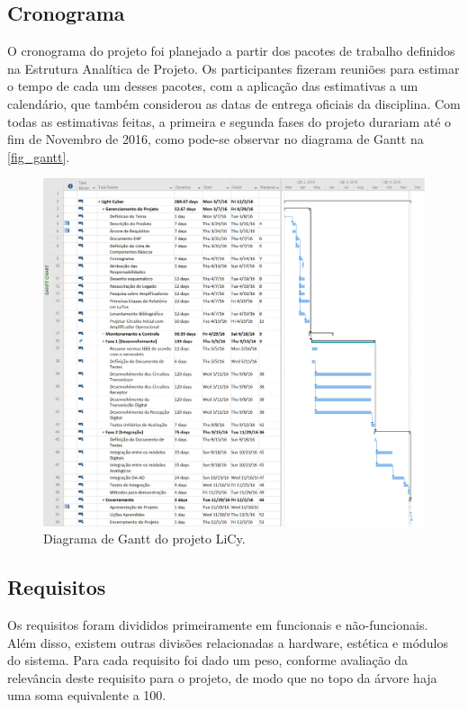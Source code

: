 	\subsection{Cronograma}\label{subsec-cronograma}

	O cronograma do projeto foi planejado a partir dos pacotes de trabalho definidos na Estrutura Analítica de Projeto. Os participantes fizeram reuniões para estimar o tempo de cada um desses pacotes, com a aplicação das estimativas a um calendário, que também considerou as datas de entrega oficiais da disciplina. Com todas as estimativas feitas, a primeira e segunda fases do projeto durariam até o fim de Novembro de 2016, como pode-se observar no diagrama de Gantt na \autoref{fig_gantt}.

	\begin{figure}[h!]
		\caption{\label{fig_gantt}Diagrama de Gantt do projeto LiCy.}
		\centering
		\includegraphics[width=1.0\textwidth]{gantt.png}
	\end{figure}

	\subsection{Requisitos}\label{subsec-requisitos}

	Os requisitos foram divididos primeiramente em funcionais e não-funcionais. Além disso, existem outras divisões relacionadas a hardware, estética e módulos do sistema. Para cada requisito foi dado um peso, conforme avaliação da relevância deste requisito para o projeto, de modo que no topo da árvore haja uma soma equivalente a 100.

